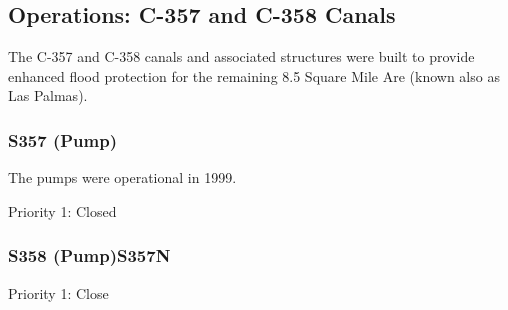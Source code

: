 

\clearpage
\subsection{Operations: C-357 and C-358 Canals}
The C-357 and C-358 canals and associated structures were built to provide enhanced flood protection for the remaining 8.5 Square Mile Are (known also as Las Palmas).

\subsubsection{S357  (Pump)}
The pumps were operational in 1999.

\begin{packed_items}
\item Priority 1: Closed
\end{packed_items}

\subsubsection{S358 (Pump)S357N}

\begin{packed_items}
\item Priority 1: Close
\end{packed_items}

